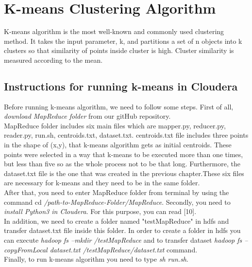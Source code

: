 
\chapter{K-means Clustering Algorithm} %

K-means algorithm is the most well-known and commonly used clustering
method. It takes the input parameter, k, and partitions a set of n objects into
k clusters so that similarity of points inside cluster is high. Cluster similarity is measured according to the mean.

\label{Chapter3} %


\section{Instructions for running k-means in Cloudera}
Before running k-means algorithm, we need to follow some steps. First of all, \textit{download MapReduce folder} from our gitHub repository.\\
MapReduce folder includes six main files which are mapper.py, reducer.py, reader.py, run.sh, centroids.txt, dataset.txt. centroids.txt file includes three points in the shape of (x,y), that k-means algorithm gets as initial centroids. These points were selected in a way that k-means to be executed more than one times, but less than five so as the whole process not to be that long. Furthermore, the dataset.txt file is the one that was created in the previous chapter.These six files are necessary for k-means and they need to be in the same folder. \\
After that, you need to enter MapReduce folder from terminal by using the command cd \textit{/path-to-MapReduce-Folder/MapReduce}.
Secondly, you need to \textit{install Python3 in Cloudera}. For this purpose, you can read [10].\\
In addition, we need to create a folder named "testMapReduce" in hdfs and transfer dataset.txt file inside this folder. In order to create a folder in hdfs you can execute \textit{hadoop fs –mkdir /testMapReduce} and to transfer dataset \textit{hadoop fs –copyFromLocal dataset.txt /testMapReduce/dataset.txt} command.\\
Finally, to run k-means algorithm you need to type \textit{sh run.sh}.


